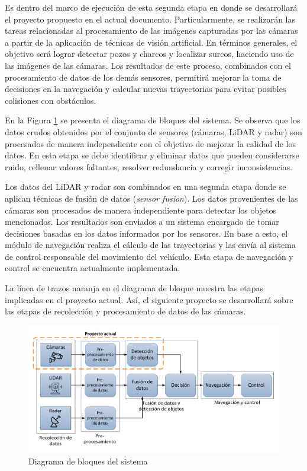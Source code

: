 \documentclass[
11pt, %
]{charter}
\begin{document}
Es dentro del marco de ejecución de esta segunda etapa en donde se desarrollará el proyecto propuesto en el actual documento. Particularmente, se realizarán las tareas relacionadas al procesamiento de las imágenes capturadas por las cámaras a partir de la aplicación de técnicas de visión artificial. En términos generales, el objetivo será lograr detectar pozos y charcos y localizar surcos, haciendo uso de las imágenes de las cámaras. Los resultados de este proceso, combinados con el procesamiento de datos de los demás sensores, permitirá mejorar la toma de decisiones en la navegación y calcular nuevas trayectorias para evitar posibles colisiones con obstáculos.

En la Figura \ref{fig:diagBloques} se presenta el diagrama de bloques del sistema. Se observa que los datos crudos obtenidos por el conjunto de sensores (cámaras, LiDAR y radar) son procesados de manera independiente con el objetivo de mejorar la calidad de los datos. En esta etapa se debe identificar y eliminar datos que pueden considerarse ruido, rellenar valores faltantes, resolver redundancia y corregir inconsistencias.

Los datos del LiDAR y radar son combinados en una segunda etapa donde se aplican técnicas de fusión de datos (\emph{sensor fusion}). Los datos provenientes de las cámaras son procesados de manera independiente para detectar los objetos mencionados. Los resultados son enviados a un sistema encargado de tomar decisiones basadas en los datos informados por los sensores. En base a esto, el módulo de navegación realiza el cálculo de las trayectorias y las envía al sistema de control responsable del movimiento del vehículo. Esta etapa de navegación y control se encuentra actualmente implementada.

La línea de trazos naranja en el diagrama de bloque muestra las etapas implicadas en el proyecto actual. Así, el siguiente proyecto se desarrollará sobre las etapas de recolección y procesamiento de datos de las cámaras.


\begin{figure}[htpb]
\centering 
\includegraphics[width=1\textwidth]{./Figuras/diagBloques.pdf}
\caption{Diagrama de bloques del sistema}
\label{fig:diagBloques}
\end{figure}
\end{document}
